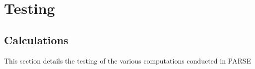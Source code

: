 \chapter{Testing}
\label{testing}
\section{Calculations}
This section details the testing of the various computations conducted in PARSE


